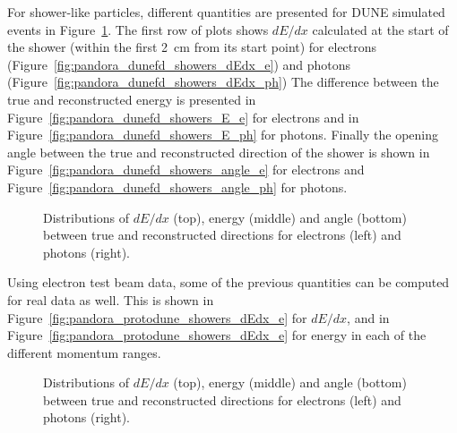 For shower-like particles, different quantities are presented for DUNE  simulated events in Figure~\ref{fig:pandora_dunefd_showers}. The first row of plots shows $dE/dx$ calculated at the start of the shower (within the first \SI{2}{cm} from its start point) for electrons (Figure~\ref{fig:pandora_dunefd_showers_dEdx_e}) and photons (Figure~\ref{fig:pandora_dunefd_showers_dEdx_ph}) %
The difference between the true and reconstructed energy is presented in Figure~\ref{fig:pandora_dunefd_showers_E_e} for electrons and in Figure~\ref{fig:pandora_dunefd_showers_E_ph} for photons. Finally the opening angle between the true and reconstructed direction of the shower is shown in Figure~\ref{fig:pandora_dunefd_showers_angle_e} for electrons and Figure~\ref{fig:pandora_dunefd_showers_angle_ph}  for photons. 

\begin{figure}[!ht]
\centering
{}


\caption[Distributions of $dE/dx$, energy and angle between true and reconstructed directions for $e^-$s and $\gamma$s]{Distributions of $dE/dx$ (top), energy (middle) and angle (bottom) between true and reconstructed directions for electrons (left) and photons (right).}
\label{fig:pandora_dunefd_showers}
\end{figure}


Using  electron test beam data, some of the previous quantities can be computed for real data as well. This is shown in Figure~\ref{fig:pandora_protodune_showers_dEdx_e} for $dE/dx$, and in Figure~\ref{fig:pandora_protodune_showers_dEdx_e} for energy in each of the different momentum ranges.   

\begin{figure}[!ht]
\centering
{}
\caption[Distributions of $dE/dx$, energy and angle between true and reconstructed directions for $e^-$s and $\gamma$s????]{
Distributions of $dE/dx$ (top), energy (middle) and angle (bottom) between true and reconstructed directions for electrons (left) and photons (right).}
\label{fig:pandora_protodune_showers}
\end{figure}
